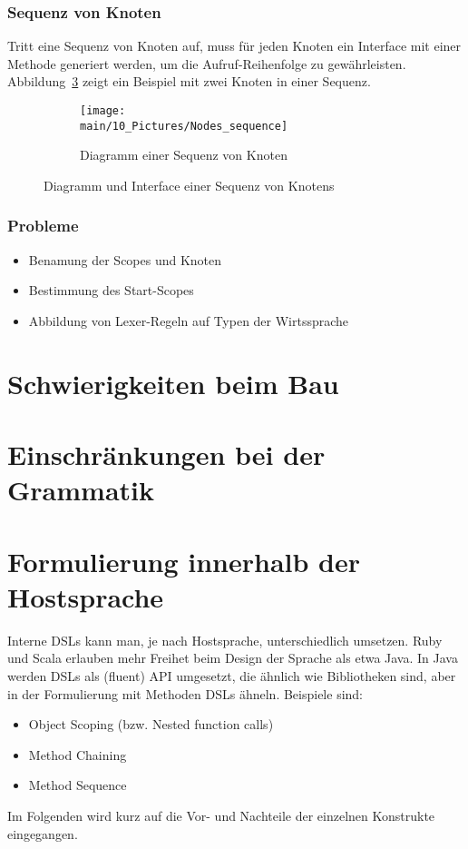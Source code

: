 \documentclass[../InterneDSLs.tex]{subfiles}
\begin{document}
\subsubsection{Sequenz von Knoten}
Tritt eine Sequenz von Knoten auf, muss für jeden Knoten ein Interface mit einer Methode generiert werden, um die Aufruf-Reihenfolge zu gewährleisten. Abbildung~\ref{FIG:SequenceNode} zeigt ein Beispiel mit zwei Knoten in einer Sequenz.
\begin{figure}[ht]
\centering
  \begin{subfigure}[c]{0.49\textwidth}
    \texttt{[image: \\main/10\_Pictures/Nodes\_sequence]}
    \caption{Diagramm einer Sequenz von Knoten}
    \label{FIG:DiagramSequenceNode}
  \end{subfigure}
  \begin{subfigure}[c]{0.49\textwidth}
    
    \label{FIG:JInterfaceSequenceNode}
  \end{subfigure}
  \caption{Diagramm und Interface einer Sequenz von Knotens}
  \label{FIG:SequenceNode}
\end{figure}

\subsubsection{Probleme}
\begin{itemize}
	\item Benamung der Scopes und Knoten
	\item Bestimmung des Start-Scopes
	\item Abbildung von Lexer-Regeln auf Typen der Wirtssprache
\end{itemize}


\section{Schwierigkeiten beim Bau}

\section{Einschränkungen bei der Grammatik}

\section{Formulierung innerhalb der Hostsprache}
Interne DSLs kann man, je nach Hostsprache, unterschiedlich umsetzen. Ruby und Scala erlauben mehr Freihet beim Design der Sprache als etwa Java. In Java werden DSLs als (fluent) API umgesetzt, die ähnlich wie Bibliotheken sind, aber in der Formulierung mit Methoden DSLs ähneln. Beispiele sind:
\begin{itemize}
	\item Object Scoping (bzw. Nested function calls)
	\item Method Chaining
	\item Method Sequence
\end{itemize}
Im Folgenden wird kurz auf die Vor- und Nachteile der einzelnen Konstrukte eingegangen.
\end{document}
